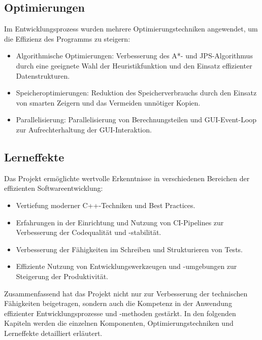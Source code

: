 \subsection*{Optimierungen}
Im Entwicklungsprozess wurden mehrere Optimierungstechniken angewendet, um die Effizienz des Programms zu steigern:
\begin{itemize}
\item Algorithmische Optimierungen: Verbesserung des A*- und \ac{JPS}-Algorithmus durch eine geeignete Wahl der Heuristikfunktion und den Einsatz effizienter Datenstrukturen.
\item Speicheroptimierungen: Reduktion des Speicherverbrauchs durch den Einsatz von smarten Zeigern und das Vermeiden unnötiger Kopien.
\item Parallelisierung: Parallelisierung von Berechnungsteilen und \ac{GUI}-Event-Loop zur Aufrechterhaltung der \ac{GUI}-Interaktion.
\end{itemize}

\subsection*{Lerneffekte}
Das Projekt ermöglichte wertvolle Erkenntnisse in verschiedenen Bereichen der effizienten Softwareentwicklung:
\begin{itemize}
\item Vertiefung moderner C++-Techniken und Best Practices.
\item Erfahrungen in der Einrichtung und Nutzung von CI-Pipelines zur Verbesserung der Codequalität und -stabilität.
\item Verbesserung der Fähigkeiten im Schreiben und Strukturieren von Tests.
\item Effiziente Nutzung von Entwicklungswerkzeugen und -umgebungen zur Steigerung der Produktivität.
\end{itemize}
Zusammenfassend hat das Projekt nicht nur zur Verbesserung der technischen Fähigkeiten beigetragen, sondern auch die Kompetenz in der Anwendung effizienter Entwicklungsprozesse und -methoden gestärkt.
In den folgenden Kapiteln werden die einzelnen Komponenten, Optimierungstechniken und Lerneffekte detailliert erläutert.



